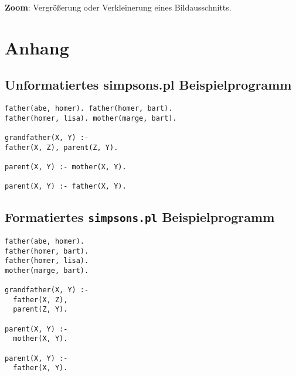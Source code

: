 \documentclass[parskip=full,11pt,twoside]{scrartcl}
\begin{document}
\textbf{Zoom}:
Vergrößerung oder Verkleinerung eines Bildausschnitts.

\newpage
\section{Anhang}

\subsection{Unformatiertes simpsons.pl Beispielprogramm}

\begin{lstlisting}
father(abe, homer). father(homer, bart).
father(homer, lisa). mother(marge, bart).

grandfather(X, Y) :-
father(X, Z), parent(Z, Y).

parent(X, Y) :- mother(X, Y).

parent(X, Y) :- father(X, Y).
\end{lstlisting}

\subsection{Formatiertes \texttt{simpsons.pl} Beispielprogramm}

\begin{lstlisting}
father(abe, homer).
father(homer, bart).
father(homer, lisa).
mother(marge, bart).

grandfather(X, Y) :-
  father(X, Z),
  parent(Z, Y).

parent(X, Y) :-
  mother(X, Y).

parent(X, Y) :-
  father(X, Y).
\end{lstlisting}
\end{document}
